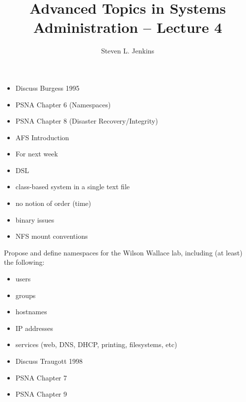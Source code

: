 \documentclass{slides}
\title{Advanced Topics in Systems Administration -- Lecture 4}
\author{Steven L. Jenkins}
\newcommand{\bi}{\begin{itemize}}
\newcommand{\ei}{\end{itemize}}
\begin{document}
\maketitle


\bi
\item Discuss Burgess 1995
\item PSNA Chapter 6 (Namespaces)
\item PSNA Chapter 8 (Disaster Recovery/Integrity)
\item AFS Introduction
\item For next week
\ei


\bi
\item DSL
\item class-based system in a single text file
\item no notion of order (time)
\item binary issues
\item NFS mount conventions
\ei



Propose and define namespaces for the Wilson Wallace lab, including
(at least) the following:
\bi
\item users
\item groups
\item hostnames
\item IP addresses
\item services (web, DNS, DHCP, printing, filesystems, etc)
\ei



\bi
\item Discuss Traugott 1998
\item PSNA Chapter 7 
\item PSNA Chapter 9
\ei
\end{document}
